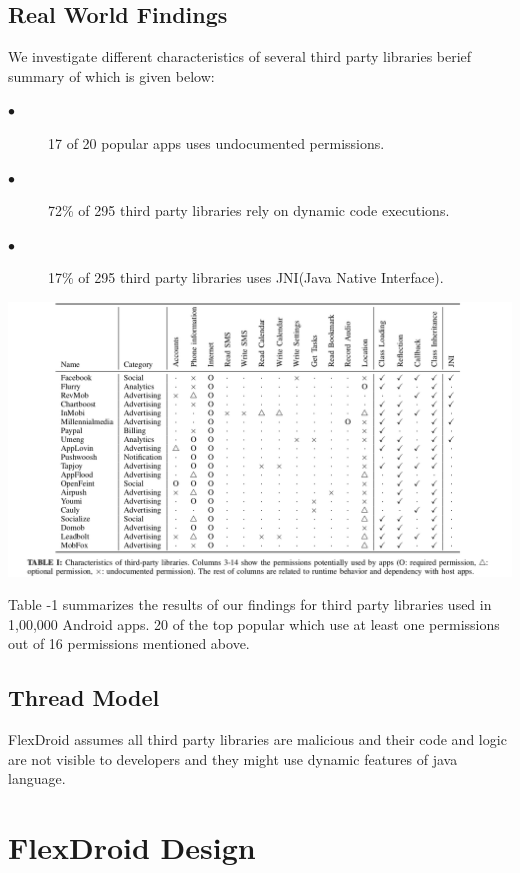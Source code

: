 \documentclass[11pt]{report}
\begin{document}
\section{Real World Findings}
\par We investigate different characteristics of several third party libraries berief summary of which is given below:
\begin{description}
 \item[$\bullet$] 17 of 20 popular apps uses undocumented permissions.
 \item[$\bullet$] 72\% of 295 third party libraries rely on dynamic code executions.
 \item[$\bullet$] 17\% of 295 third party libraries uses JNI(Java Native Interface).
\end{description}

\includegraphics[width=150mm]{./images/table-1.png}
\par Table -1 summarizes the results of our findings for third party libraries used in 1,00,000 Android apps. 20 of the top popular which use at least one permissions out of 16 
permissions mentioned above.
\section{Thread Model}
\par FlexDroid assumes all third party libraries are malicious and their code and logic are not visible to developers and they might use dynamic features of java language.

\chapter{FlexDroid Design}
\end{document}
